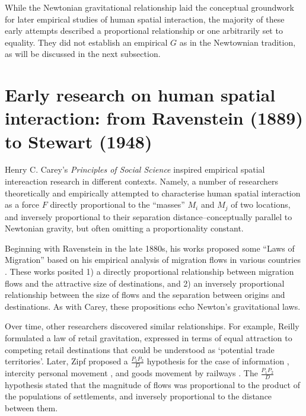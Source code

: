 \documentclass[
  10pt,
  letterpaper,
]{article}
\begin{document}
While the Newtonian gravitational relationship laid the conceptual
groundwork for later empirical studies of human spatial interaction, the
majority of these early attempts described a proportional relationship
or one arbitrarily set to equality. They did not establish an empirical
\(G\) as in the Newtownian tradition, as will be discussed in the next
subsection.

\section{Early research on human spatial interaction: from Ravenstein
(1889) to Stewart
(1948)}\label{early-research-on-human-spatial-interaction-from-ravenstein-1889-to-stewart-1948}

Henry C. Carey's \emph{Principles of Social Science}
\citep{careyPrinciplesSocialScience1858} inspired empirical spatial
intereaction research in different contexts. Namely, a number of
researchers theoretically and empirically attempted to characterise
human spatial interaction as a force \(F\) directly proportional to the
``masses'' \(M_i\) and \(M_j\) of two locations, and inversely
proportional to their separation distance--conceptually parallel to
Newtonian gravity, but often omitting a proportionality constant.

Beginning with Ravenstein in the late 1880s, his works proposed some
``Laws of Migration'' based on his empirical analysis of migration flows
in various countries
\citep{ravensteinLawsMigration1885, ravensteinLawsMigration1889}. These
works posited 1) a directly proportional relationship between migration
flows and the attractive size of destinations, and 2) an inversely
proportional relationship between the size of flows and the separation
between origins and destinations. As with Carey, these propositions echo
Newton's gravitational laws.

Over time, other researchers discovered similar relationships. For
example, Reilly \citep{reilly1929methods} formulated a law of retail
gravitation, expressed in terms of equal attraction to competing retail
destinations that could be understood as `potential trade territories'.
Later, Zipf proposed a \(\frac{P_1P_2}{D}\) hypothesis for the case of
information \citep{zipfDeterminantsCirculationInformation1946},
intercity personal movement \citep{zipfHypothesisIntercityMovement1946},
and goods movement by railways \citep{zipfHypothesisCaseRailway1946}.
The \(\frac{P_1P_2}{D}\) hypothesis stated that the magnitude of flows
was proportional to the product of the populations of settlements, and
inversely proportional to the distance between them.
\end{document}
